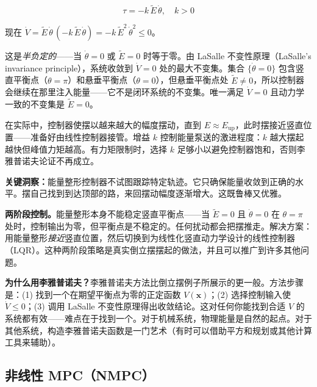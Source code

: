 \begin{equation}
\tau = -k\,\tilde{E}\,\dot{\theta}, \quad k > 0
\end{equation}

现在 $\dot{V} = \tilde{E}\,\dot{\theta}\,(-k\,\tilde{E}\,\dot{\theta}) = -k\,\tilde{E}^2\,\dot{\theta}^2 \leq 0$。

这是\textit{半负定的}——当 $\dot{\theta} = 0$ 或 $\tilde{E} = 0$ 时等于零。由 LaSalle 不变性原理（LaSalle's invariance principle），系统收敛到 $\dot{V} = 0$ 处的最大不变集。集合 $\{\dot{\theta} = 0\}$ 包含竖直平衡点（$\theta = \pi$）和悬垂平衡点（$\theta = 0$），但悬垂平衡点处 $\tilde{E} \neq 0$，所以控制器会继续在那里注入能量——它不是闭环系统的不变集。唯一满足 $\dot{V} = 0$ 且动力学一致的不变集是 $\tilde{E} = 0$。

在实际中，控制器使摆以越来越大的幅度摆动，直到 $E \approx E_{\text{up}}$，此时摆接近竖直位置——准备好由线性控制器接管。增益 $k$ 控制能量泵送的激进程度：$k$ 越大摆起越快但峰值力矩越高。有力矩限制时，选择 $k$ 足够小以避免控制器饱和，否则李雅普诺夫论证不再成立。

\textbf{关键洞察：}能量整形控制器不试图跟踪特定轨迹。它只确保能量收敛到正确的水平。摆自己找到到达顶部的路，来回摆动幅度逐渐增大。这既鲁棒又优雅。

\textbf{两阶段控制。}能量整形本身不能稳定竖直平衡点——当 $\tilde{E} = 0$ 且 $\dot{\theta} = 0$ 在 $\theta = \pi$ 处时，控制输出为零，但平衡点是不稳定的。任何扰动都会把摆推走。解决方案：用能量整形\textit{接近}竖直位置，然后切换到为线性化竖直动力学设计的线性控制器（LQR）。这种两阶段策略是真实倒立摆摆起的做法，并且可以推广到许多其他问题。

\textbf{为什么用李雅普诺夫？}李雅普诺夫方法比倒立摆例子所展示的更一般。方法步骤是：(1) 找到一个在期望平衡点为零的正定函数 $V(\mathbf{x})$；(2) 选择控制输入使 $\dot{V} \leq 0$；(3) 调用 LaSalle 不变性原理得出收敛结论。这对任何你能找到合适 $V$ 的系统都有效——难点在于找到一个。对于机械系统，物理能量是自然的起点。对于其他系统，构造李雅普诺夫函数是一门艺术（有时可以借助平方和规划或其他计算工具来辅助）。

\subsection{非线性 MPC（NMPC）}

